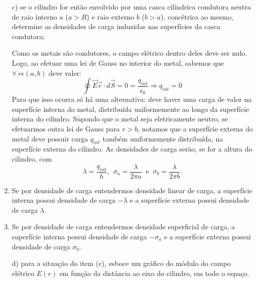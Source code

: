 \begin{enumerate}[start=1,label={\bfseries Q\arabic*.}]
c) se o cilindro for então envolvido por uma casca cilíndrica condutora neutra de raio interno $a$ ($a > R$) e raio externo $b$ ($b > a$), concêtrica ao mesmo, determine as densidades de carga induzidas nas superfícies da casca condutora;

\resposta

Como os metais são condutores, o campo elétrico dentro deles deve ser nulo. Logo, ao efetuar uma lei de Gauss no interior do metal, sabemos que $\forall \ r \epsilon (a,b)$ deve valer:
$$
\oint \vec{E} \vec{r} \cdot d \vec{S} = 0 = \frac{q_{int}}{\epsilon_{0}} \Rightarrow q_{int} = 0
$$
Para que isso ocorra só há uma alternativa: deve haver uma carga de valor na superfície interna do metal, distribuída uniformemente ao longo da superfície interna do cilindro. Supondo que o metal seja eletricamente neutro, se efetuarmos outra lei de Gauss para $r > b$, notamos que a superfície externa do metal deve possuir carga $q_{int}$ também uniformemente distribuída, na superfície externa do cilindro. As densidades de carga serão, se for a altura do cilindro, com
$$
\lambda = \frac{q_{int}}{h}, \ \ \sigma_{a} = \frac{\lambda}{2 \pi a} \ \mbox{ e } \   \sigma_{b} = \frac{\lambda}{2 \pi b}.
$$


\item[] Se por densidade de carga entendermos densidade linear de carga, a superfície interna possui densidade de carga $-\lambda$ e a superfície externa possui densidade de carga $\lambda$.



\item[] Se por densidade de carga entendermos densidade superficial de carga, a superfície interna possui densidade de carga $-\sigma_{a}$ e a superfície externa possui densidade de carga $\sigma_{b}$.



d) para a situação do item (c), esboce um gráfico do módulo do campo elétrico $E(r)$ em função da distância ao eixo do cilindro, em todo o espaço.

\resposta


\end{enumerate}
